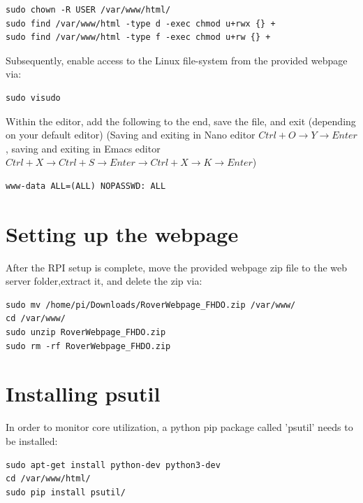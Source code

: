 \begin{lstlisting}
sudo chown -R USER /var/www/html/
sudo find /var/www/html -type d -exec chmod u+rwx {} +
sudo find /var/www/html -type f -exec chmod u+rw {} +
\end{lstlisting}
Subsequently, enable access to the Linux file-system from the provided webpage via:
\begin{lstlisting}
sudo visudo
\end{lstlisting}
Within the editor, add the following to the end, save the file, and exit (depending on your default editor)
(Saving and exiting in Nano editor $Ctrl+O \rightarrow Y \rightarrow Enter$, saving and exiting in Emacs editor $Ctrl + X \rightarrow Ctrl + S \rightarrow Enter \rightarrow Ctrl + X \rightarrow K \rightarrow Enter$) 
\begin{lstlisting}
www-data ALL=(ALL) NOPASSWD: ALL
\end{lstlisting}
\section{Setting up the webpage}
After the RPI setup is complete, move the provided webpage zip file to the web server folder,extract it, and delete the zip via:
\begin{lstlisting}
sudo mv /home/pi/Downloads/RoverWebpage_FHDO.zip /var/www/
cd /var/www/ 
sudo unzip RoverWebpage_FHDO.zip
sudo rm -rf RoverWebpage_FHDO.zip
\end{lstlisting}
\section{Installing psutil}
In order to monitor core utilization, a python pip package called 'psutil' needs to be installed:
\begin{lstlisting}
sudo apt-get install python-dev python3-dev
cd /var/www/html/
sudo pip install psutil/
\end{lstlisting}
